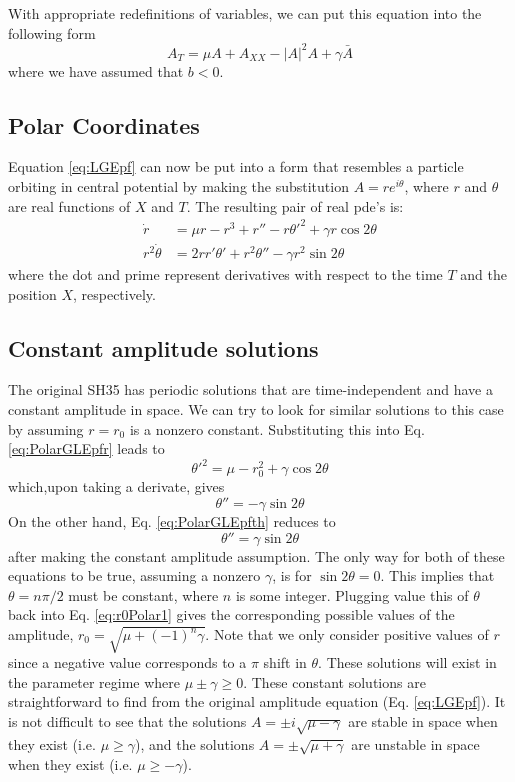 \documentclass[api,pof,pre,12pt,a4paper]{revtex4-1}
\newcommand{\beqn}{\begin{equation}}
\newcommand{\eeqn}{\end{equation}}
\begin{document}
With appropriate redefinitions of variables, we can put this equation into the following form
\begin{equation}
A_T  = \mu A + A_{XX} - |A|^2 A+\gamma\bar{A}
\label{eq:LGEpf}
\end{equation}
where we have assumed that $b<0$.

\subsection{Polar Coordinates}
Equation \ref{eq:LGEpf}  can now be put into a form that resembles a particle orbiting in central potential by making the substitution $A=r e^{i\theta}$, where $r$ and $\theta$ are real functions of $X$ and $T$.  The resulting pair of real pde's is:
\begin{subequations}
\begin{align}
\dot{r}&=\mu r - r^3 +r''-r\theta'^2+\gamma r \cos2\theta 
\label{eq:PolarGLEpfr} \\
r^2\dot{\theta}&=2 r r' \theta'+r^2\theta''-\gamma r^2 \sin 2\theta
\label{eq:PolarGLEpfth}
\end{align}
\end{subequations}
where the dot and prime represent derivatives with respect to the time $T$ and the position $X$, respectively.

\subsection{Constant amplitude solutions}
The original SH35 has periodic solutions that are time-independent and have a constant amplitude in space.  We can try to look for similar solutions to this case by assuming $r=r_0$ is a nonzero constant. Substituting this into Eq. \ref{eq:PolarGLEpfr} leads to
\beqn
\theta'^2=\mu-r_0^2+\gamma \cos2\theta
\label{eq:r0Polar1}
\eeqn
which,upon taking a derivate, gives
\beqn
\theta''=-\gamma \sin2\theta
\eeqn
On the other hand, Eq. \ref{eq:PolarGLEpfth} reduces to 
\beqn
\theta''=\gamma \sin2\theta
\eeqn
after making the constant amplitude assumption.  The only way for both of these equations to be true, assuming a nonzero $\gamma$, is for $\sin2\theta=0$. This implies that $\theta=n\pi/2$ must be constant, where $n$ is some integer.  Plugging value this of $\theta$ back into Eq. \ref{eq:r0Polar1} gives the corresponding possible values of the amplitude, $r_0=\sqrt{\mu +(-1)^n\gamma}$. Note that we only consider positive values of $r$ since a negative value corresponds to a $\pi$ shift in $\theta$. These solutions will exist in the parameter regime where $\mu\pm\gamma\ge 0$.  These constant solutions are straightforward to find from the original amplitude equation (Eq. \ref{eq:LGEpf}).  It is not difficult to see that the solutions $A=\pm i \sqrt{\mu-\gamma}$ are stable in space when they exist (i.e. $\mu \geq \gamma$), and the solutions $A=\pm \sqrt{\mu+\gamma}$ are unstable in space when they exist (i.e. $\mu \geq-\gamma$).
\end{document}
